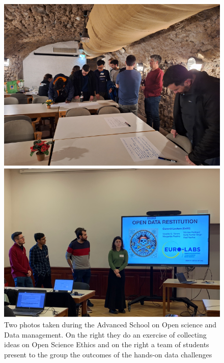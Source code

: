 \begin{figure}[!h]
    \centering
\begin{minipage}{0.48\textwidth}
        \centering
        \includegraphics[width=\textwidth]{graphics/Open science ethics.png}
    \end{minipage}
    \hfill %
    \begin{minipage}{0.51\textwidth}
        \centering
        \includegraphics[width=\textwidth]{graphics/presentation-Open Science.png}
    \end{minipage}   
 \caption{Two photos taken during the Advanced School on Open science and Data management. On the right they do an exercise of collecting ideas on Open Science Ethics and on the right a team of students present to the group the outcomes of the hands-on data challenges}
    \label{fig:Open_Science_school}
\end{figure}



